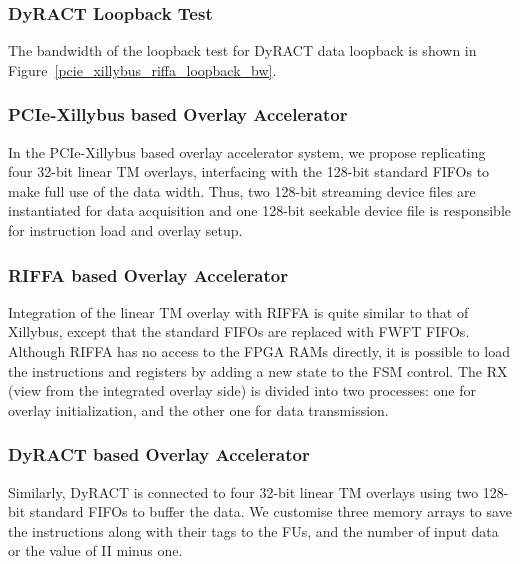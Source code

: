 \subsubsection{DyRACT Loopback Test}
The bandwidth of the loopback test for DyRACT data loopback is shown in Figure~\ref{pcie_xillybus_riffa_loopback_bw}. 



\subsubsection{PCIe-Xillybus based Overlay Accelerator}
In the PCIe-Xillybus based overlay accelerator system, we propose replicating four 32-bit linear TM overlays, interfacing with the 128-bit standard FIFOs to make full use of the data width.
Thus, two 128-bit streaming device files are instantiated for data acquisition and one 128-bit seekable device file is responsible for instruction load and overlay setup. 

\subsubsection{RIFFA based Overlay Accelerator}
Integration of the linear TM overlay with RIFFA is quite similar to that of Xillybus, except that the standard FIFOs are replaced with FWFT FIFOs.  
Although RIFFA has no access to the FPGA RAMs directly, it is possible to load the instructions and registers by adding a new state to the FSM control. 
The RX (view from the integrated overlay side) is divided into two processes: one for overlay initialization, and the other one for data transmission. 

\subsubsection{DyRACT based Overlay Accelerator}
Similarly, DyRACT is connected to four 32-bit linear TM overlays using two 128-bit standard FIFOs to buffer the data. 
We customise three memory arrays to save the instructions along with their tags to the FUs, and the number of input data or the value of II minus one. 

